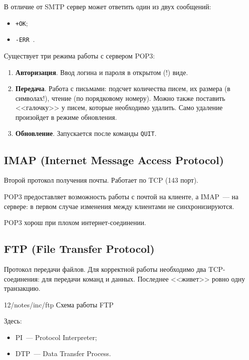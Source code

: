 В отличие от SMTP сервер может ответить один из двух сообщений:

\begin{itemize}
    \item \texttt{+OK};
    \item \texttt{-ERR \underline{\phantom{reason}}}.
\end{itemize}

Существует три режима работы с сервером POP3:

\begin{enumerate}
    \item \textbf{Авторизация}. Ввод логина и пароля в открытом (!) виде.
    \item \textbf{Передача}. Работа с письмами: подсчет количества писем, их размера (в символах!), чтение (по порядковому номеру). Можно также поставить <<галочку>> у писем, которые необходимо удалить. Само удаление произойдет в режиме обновления.
    \item \textbf{Обновление}. Запускается после команды \texttt{QUIT}.
\end{enumerate}

\subsection{IMAP (Internet Message Access Protocol)}

Второй протокол получения почты. Работает по TCP (143 порт).

POP3 предоставляет возможность работы с почтой на клиенте, а IMAP~--- на
сервере: в первом случае изменения между клиентами не синхронизируются.

POP3 хорош при плохом интернет-соединении.

\subsection{FTP (File Transfer Protocol)}

Протокол передачи файлов. Для корректной работы необходимо два TCP-соединения: для передачи команд и данных. Последнее <<живет>> ровно одну транзакцию.

\image
{\textwidth}
{12/notes/inc/ftp}
{Схема работы FTP}

Здесь:

\begin{itemize}
    \item PI~--- Protocol Interpreter;
    \item DTP~--- Data Transfer Process.
\end{itemize}

